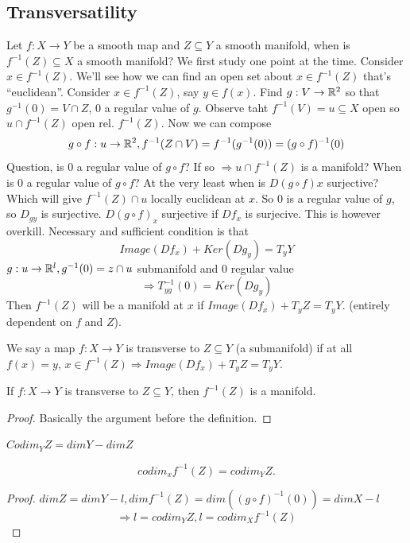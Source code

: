 \subsection*{Transversatility}
Let $f: X \to Y$ be a smooth map and $Z \subseteq Y$ a smooth manifold, when is $f ^{-1} (Z) \subseteq X $ a smooth manifold?
\newline We first study one point at the time. Consider $x\in f ^{-1}(Z)$. We'll see how we can find an open set about $x\in f ^{-1}(Z)$ that's ``euclidean''.
\newline Consider $x\in f ^{-1}(Z)$, say $y\in f(x)$.
\newline Find $g:V\to \mathbb{R}^2$ so that $g ^{-1}(0)=V\cap Z$, $0$ a regular value of $g$. Observe taht $f ^{-1}(V)=u \subseteq X $ open so $u \cap f ^{-1}(Z)$ open rel. $f ^{-1}(Z)$. Now we can compose
  $$g\circ f: u \to \mathbb{R}^2, f ^{-1}(Z\cap V)=f ^{-1}(g ^{-1}(0))=(g\circ f)^{-1}(0)$$
Question, is $0$ a regular value of $g\circ f$? If so $\Rightarrow u \cap f ^{-1} (Z)$ is a manifold?
\newline When is $0$ a regular value of $g\circ f$? At the very least when is $D(g\circ f)x$ surjective? Which will give $f ^{-1}(Z)\cap u$ locally euclidean at $x$.
\newline So $0$ is a regular value of $g$, so $D_{gy}$ is surjective.
\newline $D(g\circ f)_x$ surjective if $Df_x$ is surjecive. This is however overkill.
\newline Necessary and sufficient condition is that
  $$Image(Df_x)+Ker(Dg_y)=T_yY$$
  $g: u \to \mathbb{R}^l, g ^{-1}(0)=z\cap u$ submanifold and $0$ regular value
    $$\Rightarrow T_{yg}^{-1}(0)=Ker(Dg_y)$$
Then $f ^{-1}(Z)$ will be a manifold at $x$ if $Image(Df_x)+T_yZ=T_yY$. (entirely dependent on $f$ and $Z$).

\begin{definition}
  We say a map $f: X \to Y$ is transverse to $Z \subseteq Y$ (a submanifold) if at all $f(x)=y$, $x\in f ^{-1}(Z) \Rightarrow Image(Df_x)+T_yZ=T_yY$.
\end{definition}
\begin{theorem}
  If $f: X \to Y$ is transverse to $Z \subseteq Y$, then $f ^{-1}(Z)$ is a manifold.
\end{theorem}
\begin{proof}
  Basically the argument before the definition.
\end{proof}

\begin{remark}
  $Codim_YZ=dim Y - dim Z$
\end{remark}
\begin{corollary}
  $$codim_xf ^{-1}(Z)= codim_Y Z.$$
\end{corollary}
\begin{proof}
  $dim Z= dim Y - l, dim f ^{-1}(Z)=dim ((g\circ f) ^{-1}(0))=dim X-l$
  $$\Rightarrow l = codim_YZ, l=codim_X f ^{-1}(Z)$$
\end{proof}

